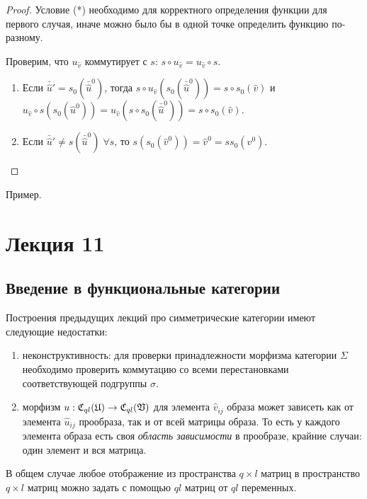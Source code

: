 \documentclass[a4paper, 12pt]{report}
\begin{document}
\begin{proof}
Условие (*) необходимо для корректного определения функции для первого случая, иначе можно было бы в одной точке определить функцию по-разному.

Проверим, что $u_{\hat{v}}$ коммутирует с $s$: $s \circ u_{\hat{v}} = u_{\hat{v}} \circ s$.
\begin{enumerate}
\item Если $\bar{\hat{u}}' = s_0(\bar{\hat{u}}^0)$, тогда $s \circ u_{\hat{v}}(s_0(\bar{\hat{u}}^0)) = s \circ s_0(\hat{v})$ и $u_{\hat{v}} \circ s(s_0(\hat{u}^0)) = u_{\hat{v}}(s \circ s_0(\bar{\hat{u}}^0)) = s \circ s_0(\hat{v})$.
\item Если $\bar{\hat{u}}' \neq s(\bar{\hat{u}}^0) \; \forall s$, то $s(s_0(\hat{v}^0)) = \hat{v}^0 = ss_0(v^0)$.
\end{enumerate}
\end{proof}
Пример.

\chapter{Лекция 11}
\section{Введение в функциональные категории}
Построения предыдущих лекций про симметрические категории имеют следующие недостатки:
\begin{enumerate}[1)]
\item неконструктивность: для проверки принадлежности морфизма категории $\Sigma$ необходимо проверить коммутацию со всеми перестановками соответствующей подгруппы $\sigma$.
\item морфизм $u: \mathfrak{C}_{ql}(\mathfrak{U}) \rightarrow \mathfrak{C}_{ql}(\mathfrak{V})$ для элемента $\hat{v}_{ij}$ образа может зависеть как от элемента $\hat{u}_{ij}$ прообраза, так и от всей матрицы образа. То есть у каждого элемента образа есть своя \emph{область зависимости} в прообразе, крайние случаи: один элемент и вся матрица.
\end{enumerate}

В общем случае любое отображение из пространства $q\times l$ матриц в пространство $q\times l$ матриц можно задать с помощью $ql$ матриц от $ql$ переменных.
\end{document}
